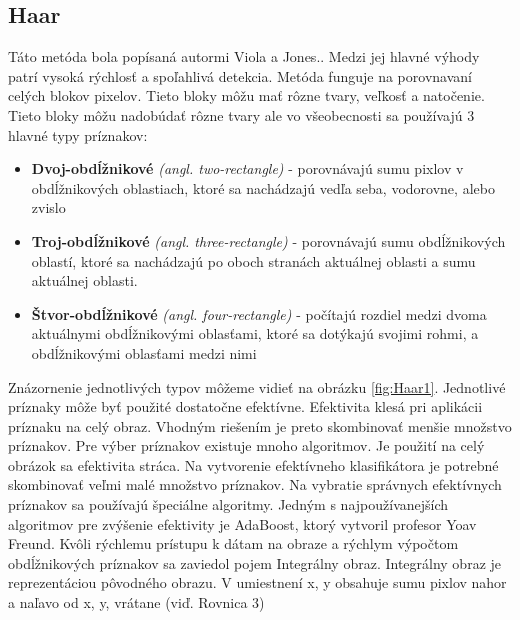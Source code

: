 \documentclass[slovak,master,dept460,male,cpp,cpdeclaration]{diploma}
\begin{document}
\subsection{Haar}
\label{Haar}
Táto metóda bola popísaná autormi Viola a Jones.\cite{viola2001rapid}. Medzi jej hlavné výhody patrí vysoká rýchlosť  a spoľahlivá detekcia. Metóda funguje na porovnavaní celých blokov pixelov. Tieto bloky môžu mať rôzne tvary, veľkosť a natočenie. Tieto bloky môžu nadobúdať rôzne tvary ale vo všeobecnosti sa používajú 3 hlavné typy príznakov:
\begin{itemize}
  \item \textbf{Dvoj-obdĺžnikové} \textit{(angl. two-rectangle)} - porovnávajú sumu pixlov v obdĺžnikových oblastiach, ktoré sa
nachádzajú vedľa seba, vodorovne, alebo zvislo
  \item \textbf{Troj-obdĺžnikové} \textit{(angl. three-rectangle)} - porovnávajú sumu obdĺžnikových oblastí, ktoré sa nachádzajú po
oboch stranách aktuálnej oblasti a sumu aktuálnej oblasti.
  \item \textbf{Štvor-obdĺžnikové} \textit{(angl. four-rectangle)} - počítajú rozdiel medzi dvoma aktuálnymi obdĺžnikovými oblasťami,
ktoré sa dotýkajú svojimi rohmi, a obdĺžnikovými oblasťami medzi nimi
  
 \end{itemize}
  Znázornenie jednotlivých typov môžeme vidieť na obrázku \ref{fig:Haar1}. Jednotlivé príznaky môže byť použité dostatočne efektívne. Efektivita klesá pri aplikácii príznaku na celý obraz. Vhodným riešením je preto skombinovať menšie množstvo príznakov. Pre výber príznakov existuje mnoho algoritmov. Je
použití na celý obrázok sa efektivita stráca. Na vytvorenie efektívneho klasifikátora je potrebné
skombinovať veľmi malé množstvo príznakov. Na vybratie správnych efektívnych príznakov sa
používajú špeciálne algoritmy. Jedným s najpoužívanejších algoritmov  pre zvýšenie efektivity je  AdaBoost\cite{freund1995desicion}, ktorý vytvoril profesor Yoav Freund. 
Kvôli rýchlemu prístupu k dátam na obraze a rýchlym výpočtom obdĺžnikových príznakov
sa zaviedol pojem Integrálny obraz. Integrálny obraz je reprezentáciou pôvodného obrazu. V
umiestnení x, y obsahuje sumu pixlov nahor a naľavo od x, y, vrátane (viď. Rovnica 3)
\end{document}
